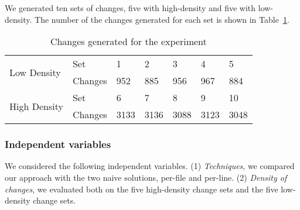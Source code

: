We generated ten sets of changes, five with high-density and five with
low-density. The number of the changes generated for each set is shown in Table~\ref{tbl:changes}.
\begin{table}[htbp]
\caption{Changes generated for the experiment}\label{tbl:changes}
\centering
\begin{tabular}{|l|l|lllll|}
  \hline
  \multirow{2}{1cm}{Low Density} & Set & 1 & 2 & 3 & 4 & 5  \\
  \cline{2-7}
                                 & Changes & 952 & 885 & 956 & 967 & 884 \\
  \hline
  \multirow{2}{1cm}{High Density} & Set & 6 & 7 & 8 & 9 & 10 \\
  \cline{2-7}
                                 & Changes & 3133 & 3136 & 3088 & 3123 & 3048\\
  \hline
\end{tabular}
\end{table}

\subsubsection{Independent variables}
We considered the following independent variables. (1)
\emph{Techniques}, we compared our approach with the two naive
solutions, per-file and per-line. (2) \emph{Density of changes}, we
evaluated both on the five high-density change sets and the five
low-density change sets. %

